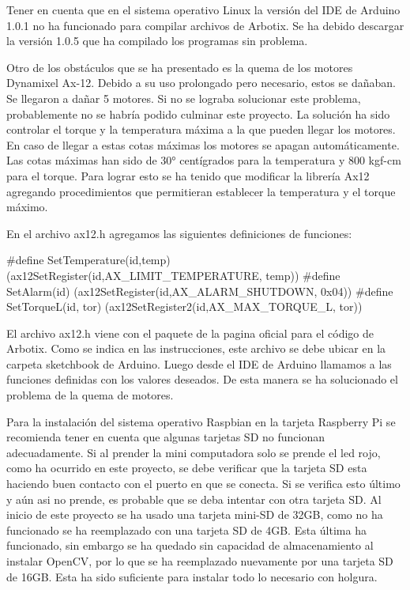 Tener en cuenta que en el sistema operativo Linux la versión del IDE de Arduino 1.0.1 no ha funcionado para compilar archivos de Arbotix. Se ha debido descargar la versión 1.0.5 que ha compilado los programas sin problema. 

Otro de los obstáculos que se ha presentado es la quema de los motores Dynamixel Ax-12. Debido a su uso prolongado pero necesario, estos se dañaban. Se llegaron a dañar 5 motores. Si no se lograba solucionar este problema, probablemente no se habría podido culminar este proyecto. La solución ha sido controlar el torque y la temperatura máxima a la que pueden llegar los motores. En caso de llegar a estas cotas máximas los motores se apagan automáticamente. Las cotas máximas han sido de 30° centígrados para la temperatura y 800 kgf-cm para el torque. Para lograr esto se ha tenido que modificar la librería Ax12 agregando procedimientos que permitieran establecer la temperatura y el torque máximo.

En el archivo ax12.h agregamos las siguientes definiciones de funciones:

#define SetTemperature(id,temp) (ax12SetRegister(id,AX_LIMIT_TEMPERATURE, temp))
#define SetAlarm(id) (ax12SetRegister(id,AX_ALARM_SHUTDOWN, 0x04)) 
#define SetTorqueL(id, tor) (ax12SetRegister2(id,AX_MAX_TORQUE_L, tor)) 

El archivo ax12.h viene con el paquete de la pagina oficial para el código de Arbotix. Como se indica en las instrucciones, este archivo se debe ubicar en la carpeta sketchbook de Arduino. Luego desde el IDE de Arduino llamamos a las funciones definidas con los valores deseados. De esta manera se ha solucionado el problema de la quema de motores.

Para la instalación del sistema operativo Raspbian en la tarjeta Raspberry Pi se recomienda tener en cuenta que algunas tarjetas SD no funcionan adecuadamente. Si al prender la mini computadora solo se prende el led rojo, como ha ocurrido en este proyecto, se debe verificar que la tarjeta SD esta haciendo buen contacto con el puerto en que se conecta. Si se verifica esto último y aún asi no prende, es probable que se deba intentar con otra tarjeta SD. Al inicio de este proyecto se ha usado una tarjeta mini-SD de 32GB, como no ha funcionado se ha reemplazado con una tarjeta SD de 4GB. Esta última ha funcionado, sin embargo se ha quedado sin capacidad de almacenamiento al instalar OpenCV, por lo que se ha reemplazado nuevamente por una tarjeta SD de 16GB. Esta ha sido suficiente para instalar todo lo necesario con holgura.    

